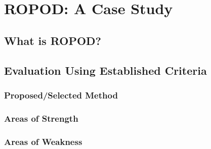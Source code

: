 

  \chapter{ROPOD: A Case Study}

  \section{ What is ROPOD? }


  \section{ Evaluation Using Established Criteria }

  \subsection{ Proposed/Selected Method }

  \subsection{ Areas of Strength }

  \subsection{ Areas of Weakness }

